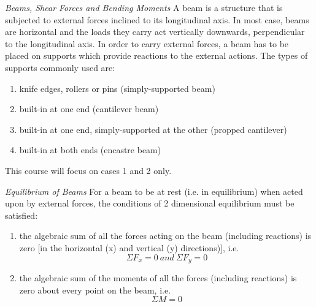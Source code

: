 \documentclass[12pt, letterpaper, twoside]{article}
\begin{document}
\begin{center}
\end{center}

\bigskip

\emph{Beams, Shear Forces and Bending Moments}
A beam is a structure that is subjected to external forces inclined to its longitudinal axis. In most case, beams are horizontal and the loads they carry act vertically downwards, perpendicular to the longitudinal axis.
In order to carry external forces, a beam has to be placed on supports which provide reactions to the external actions. The types of supports commonly used are:
\begin{enumerate}
	\item knife edges, rollers or pins (simply-supported beam)
	\item built-in at one end (cantilever beam)
	\item built-in at one end, simply-supported at the other (propped cantilever)
	\item built-in at both ends (encastre beam)
\end{enumerate}

This course will focus on cases 1 and 2 only.	

\bigskip

\emph{Equilibrium of Beams}
For a beam to be at rest (i.e. in equilibrium) when acted upon by external forces, the conditions of 2 dimensional equilibrium must be satisfied:
\begin{enumerate}
	\item the algebraic sum of all the forces acting on the beam (including reactions) is zero [in the horizontal (x) and vertical (y) directions)], i.e.
	$$ \Sigma F_x =0 \ and \ \Sigma F_y = 0 $$
	\item the algebraic sum of the moments of all the forces (including reactions) is zero about every point on the beam, i.e.
	$$ \Sigma M = 0 $$
\end{enumerate}
\end{document}
